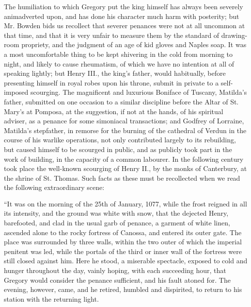The humiliation to which Gregory put the king
himself has always been severely animadverted upon, and has done his
character much harm with posterity; but Mr. Bowden bids us recollect
that severer penances were not at all uncommon at that time, and that
it is very unfair to measure them by the standard of drawing-room
propriety, and the judgment of an age of kid gloves and Naples soap.
It was a most uncomfortable thing to be kept shivering in the cold
from morning to night, and likely to cause rheumatism, of which we
have no intention at all of speaking lightly; but Henry III., the king's
father, would habitually, before presenting himself in royal robes
upon his throne, submit in private to a self-imposed scourging. The
magnificent and luxurious Boniface of Tuscany, Matilda's father,
submitted on one occasion to a similar discipline before the Altar of
St. Mary's at Pomposa, at the suggestion, if not at the hands, of his
spiritual adviser, as a penance for some simoniacal transactions; and
Godfrey of Lorraine, Matilda's stepfather, in remorse for the burning
of the cathedral of Verdun in the course of his warlike operations,
not only contributed largely to its rebuilding, but caused
himself to be scourged in public, and as publicly took part in the
work of building, in the capacity of a common labourer. In the
following century took place the well-known scourging of Henry II., by
the monks of Canterbury, at the shrine of St. Thomas. Such facts as
these must be recollected when we read the following extraordinary
scene:

``It
was on the morning of the 25th of January, 1077, while the frost
reigned in all its intensity, and the ground was white with snow, that
the dejected Henry, barefooted, and clad in the usual garb of penance,
a garment of white linen, ascended alone to the rocky fortress of
Canossa, and entered its outer gate. The place was surrounded by three
walls, within the two outer of which the imperial penitent was led,
while the portals of the third or inner wall of the fortress were
still closed against him. Here he stood, a miserable spectacle,
exposed to cold and hunger throughout the day, vainly hoping, with
each succeeding hour, that Gregory would consider the penance
sufficient, and his fault atoned for. The evening, however, came, and
he retired, humbled and dispirited, to return to his station with the
returning light.

